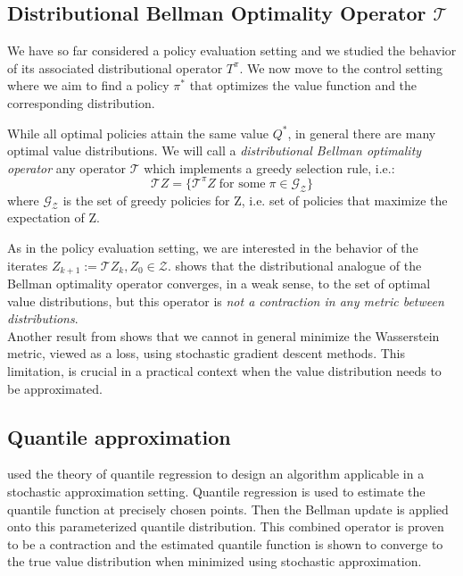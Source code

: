 \subsection{Distributional Bellman Optimality Operator \texorpdfstring{$\mathcal{T}$}{}}
We have so far considered a policy evaluation setting and we studied
the behavior of its associated distributional operator $T^\pi$.
We now move to the control setting where we aim to find a policy $\pi^{*}$ that optimizes the value function
and the 
corresponding distribution.

While all optimal policies attain the same value $Q^{*}$, in general there are
many optimal value distributions.
We will call a \textit{distributional Bellman optimality operator} any operator $\mathcal{T}$ 
which implements a greedy selection
rule, i.e.:
\begin{equation*}
    \mathcal{T}Z = \big\{ \mathcal{T}^\pi Z \; \text{for some}\; \pi \in   \mathcal{G_Z} \big\}
\end{equation*}
where $\mathcal{G_Z}$ is the set of greedy policies for Z, i.e. set of policies that maximize
the expectation of Z.

As in the policy evaluation setting, we are interested in the behavior of the iterates 
$Z_{k+1} := \mathcal{T}Z_k, Z_0 \in \mathcal{Z}$.
\citet{Bellemare2017} shows that the distributional analogue of the Bellman optimality operator converges, in a weak sense,
to the set of optimal value distributions, but
this operator is \textit{not a contraction in any metric between distributions}.\\
Another result from \citet{Bellemare2017} shows that we cannot in general minimize the Wasserstein metric, 
viewed as a loss, using stochastic gradient descent methods. This limitation, is crucial
in a practical context when the value distribution needs to be approximated.

\subsection{Quantile approximation} \label{sec:appendix_quantile_approximation}
\cite{Dabney2018a} used the theory of quantile regression \cite{koenker2005} to
design an algorithm applicable in a stochastic approximation setting.
Quantile regression is used to estimate the quantile function at precisely chosen points.
Then the Bellman update is applied onto this parameterized quantile distribution.
This combined operator is proven to be a contraction and the estimated quantile function
is shown to converge to the true value distribution when minimized using stochastic approximation.

